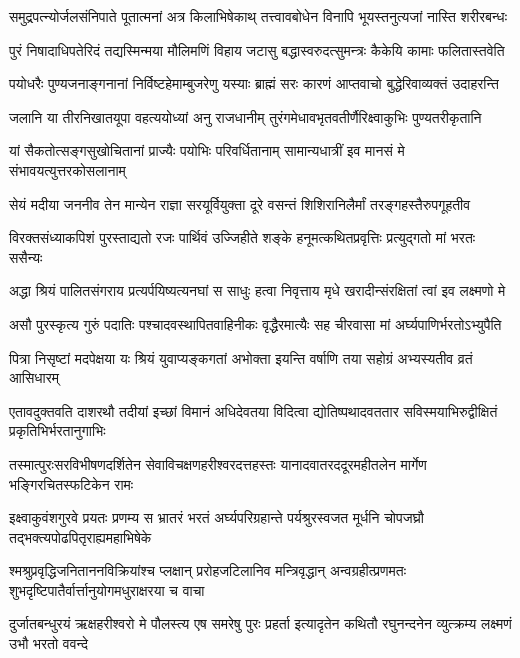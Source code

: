 \twolineshloka
{समुद्रपत्न्योर्जलसंनिपाते पूतात्मनां अत्र किलाभिषेकाथ्}
{तत्त्वावबोधेन विनापि भूयस्तनुत्यजां नास्ति शरीरबन्धः}%

\twolineshloka
{पुरं निषादाधिपतेरिदं तद्यस्मिन्मया मौलिमणिं विहाय}
{जटासु बद्धास्वरुदत्सुमन्त्रः कैकेयि कामाः फलितास्तवेति}%

\twolineshloka
{पयोधरैः पुण्यजनाङ्गनानां निर्विष्टहेमाम्बुजरेणु यस्याः}
{ब्राह्मं सरः कारणं आप्तवाचो बुद्धेरिवाव्यक्तं उदाहरन्ति}%

\twolineshloka
{जलानि या तीरनिखातयूपा वहत्ययोध्यां अनु राजधानीम्}
{तुरंगमेधावभृतवतीर्णैरिक्ष्वाकुभिः पुण्यतरीकृतानि}%

\twolineshloka
{यां सैकतोत्सङ्गसुखोचितानां प्राज्यैः पयोभिः परिवर्धितानाम्}
{सामान्यधात्रीं इव मानसं मे संभावयत्युत्तरकोसलानाम्}%

\twolineshloka
{सेयं मदीया जननीव तेन मान्येन राज्ञा सरयूर्वियुक्ता}
{दूरे वसन्तं शिशिरानिलैर्मां तरङ्गहस्तैरुपगूहतीव}%

\twolineshloka
{विरक्तसंध्याकपिशं पुरस्ताद्यतो रजः पार्थिवं उज्जिहीते}
{शङ्के हनूमत्कथितप्रवृत्तिः प्रत्युद्गतो मां भरतः ससैन्यः}%

\twolineshloka
{अद्धा श्रियं पालितसंगराय प्रत्यर्पयिष्यत्यनघां स साधुः}
{हत्वा निवृत्ताय मृधे खरादीन्संरक्षितां त्वां इव लक्ष्मणो मे}%

\twolineshloka
{असौ पुरस्कृत्य गुरुं पदातिः पश्चादवस्थापितवाहिनीकः}
{वृद्धैरमात्यैः सह चीरवासा मां अर्घ्यपाणिर्भरतोऽभ्युपैति}%

\twolineshloka
{पित्रा निसृष्टां मदपेक्षया यः श्रियं युवाप्यङ्कगतां अभोक्ता}
{इयन्ति वर्षाणि तया सहोग्रं अभ्यस्यतीव व्रतं आसिधारम्}%

\twolineshloka
{एतावदुक्तवति दाशरथौ तदीयां इच्छां विमानं अधिदेवतया विदित्वा}
{द्योतिष्पथादवततार सविस्मयाभिरुद्वीक्षितं प्रकृतिभिर्भरतानुगाभिः}%

\twolineshloka
{तस्मात्पुरःसरविभीषणदर्शितेन सेवाविचक्षणहरीश्वरदत्तहस्तः}
{यानादवातरददूरमहीतलेन मार्गेण भङ्गिरचितस्फटिकेन रामः}%

\twolineshloka
{इक्ष्वाकुवंशगुरवे प्रयतः प्रणम्य स भ्रातरं भरतं अर्घ्यपरिग्रहान्ते}
{पर्यश्रुरस्वजत मूर्धनि चोपजघ्रौ तद्भक्त्यपोढपितृराह्यमहाभिषेके}%

\twolineshloka
{श्मश्रुप्रवृद्धिजनिताननविक्रियांश्च प्लक्षान् प्ररोहजटिलानिव मन्त्रिवृद्धान्}
{अन्वग्रहीत्प्रणमतः शुभदृष्टिपातैर्वार्त्तानुयोगमधुराक्षरया च वाचा}%

\twolineshloka
{दुर्जातबन्धुरयं ऋक्षहरीश्वरो मे पौलस्त्य एष समरेषु पुरः प्रहर्ता}
{इत्यादृतेन कथितौ रघुनन्दनेन व्युत्क्रम्य लक्ष्मणं उभौ भरतो ववन्दे}%

